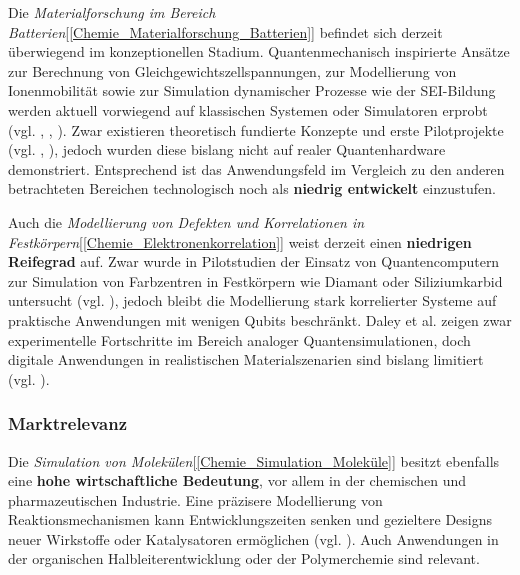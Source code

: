 Die \textit{Materialforschung im Bereich Batterien}[\ref{Chemie_Materialforschung_Batterien}] befindet sich derzeit überwiegend im konzeptionellen Stadium. Quantenmechanisch inspirierte Ansätze zur Berechnung von Gleichgewichtszellspannungen, zur Modellierung von Ionenmobilität sowie zur Simulation dynamischer Prozesse wie der SEI-Bildung werden aktuell vorwiegend auf klassischen Systemen oder Simulatoren erprobt (vgl. \cite{urban_computational_2016}, \cite{hanaor_computational_2024}, \cite{weidman_quantum_2024}). Zwar existieren theoretisch fundierte Konzepte und erste Pilotprojekte (vgl. \cite{demirApplicationQuantumComputing2024}, \cite{kaysser-pyzalla_dlr_nodate}), jedoch wurden diese bislang nicht auf realer Quantenhardware demonstriert. Entsprechend ist das Anwendungsfeld im Vergleich zu den anderen betrachteten Bereichen technologisch noch als  \textbf{niedrig entwickelt} einzustufen.

\vspace{0.5em}

Auch die \textit{Modellierung von Defekten und Korrelationen in Festkörpern}[\ref{Chemie_Elektronenkorrelation}] weist derzeit einen \textbf{niedrigen Reifegrad} auf. Zwar wurde in Pilotstudien der Einsatz von Quantencomputern zur Simulation von Farbzentren in Festkörpern wie Diamant oder Siliziumkarbid untersucht (vgl. \cite{cao_ab_2023}), jedoch bleibt die Modellierung stark korrelierter Systeme auf praktische Anwendungen mit wenigen Qubits beschränkt. Daley et al. zeigen zwar experimentelle Fortschritte im Bereich analoger Quantensimulationen, doch digitale Anwendungen in realistischen Materialszenarien sind bislang limitiert (vgl. \cite{daley_practical_2022}).


\subsubsection{Marktrelevanz}

Die \textit{Simulation von Molekülen}[\ref{Chemie_Simulation_Moleküle}] besitzt ebenfalls eine \textbf{hohe wirtschaftliche Bedeutung}, vor allem in der chemischen und pharmazeutischen Industrie. Eine präzisere Modellierung von Reaktionsmechanismen kann Entwicklungszeiten senken und gezieltere Designs neuer Wirkstoffe oder Katalysatoren ermöglichen (vgl. \cite{mcardle_quantum_2020}). Auch Anwendungen in der organischen Halbleiterentwicklung oder der Polymerchemie sind relevant.

\vspace{0.5em}

